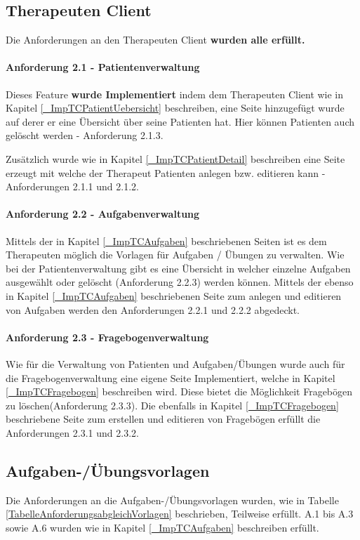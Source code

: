 \subsection{Therapeuten Client}
Die Anforderungen an den Therapeuten Client \textbf{wurden alle erfüllt.}
\paragraph{Anforderung 2.1 - Patientenverwaltung \textcolor{green}{\checkmark}}
Dieses Feature \textbf{wurde Implementiert} indem dem Therapeuten Client wie in Kapitel \ref{_ImpTCPatientUebersicht} beschreiben, eine Seite hinzugefügt wurde auf derer er eine Übersicht über seine Patienten hat. Hier können Patienten auch gelöscht werden - Anforderung 2.1.3.

Zusätzlich wurde wie in Kapitel \ref{_ImpTCPatientDetail} beschreiben eine Seite erzeugt mit welche der Therapeut Patienten anlegen bzw. editieren kann - Anforderungen 2.1.1 und 2.1.2.

\paragraph{Anforderung 2.2 - Aufgabenverwaltung \textcolor{green}{\checkmark}}
Mittels der in Kapitel \ref{_ImpTCAufgaben} beschriebenen Seiten ist es dem Therapeuten möglich die Vorlagen für Aufgaben / Übungen zu verwalten. Wie bei der Patientenverwaltung gibt es eine Übersicht in welcher einzelne Aufgaben ausgewählt oder gelöscht (Anforderung 2.2.3) werden können. Mittels der ebenso in Kapitel \ref{_ImpTCAufgaben} beschriebenen Seite zum anlegen und editieren von Aufgaben werden den Anforderungen 2.2.1 und 2.2.2 abgedeckt.

\paragraph{Anforderung 2.3 - Fragebogenverwaltung \textcolor{green}{\checkmark}}
Wie für die Verwaltung von Patienten und Aufgaben/Übungen wurde auch für die Fragebogenverwaltung eine eigene Seite Implementiert, welche in Kapitel \ref{_ImpTCFragebogen} beschreiben wird. Diese bietet die Möglichkeit Fragebögen zu löschen(Anforderung 2.3.3). Die ebenfalls in Kapitel \ref{_ImpTCFragebogen} beschriebene Seite zum erstellen und editieren von Fragebögen erfüllt die Anforderungen 2.3.1 und 2.3.2.

\subsection{Aufgaben-/Übungsvorlagen}
Die Anforderungen an die Aufgaben-/Übungsvorlagen wurden, wie in Tabelle \ref{TabelleAnforderungsabgleichVorlagen} beschrieben, Teilweise erfüllt.
A.1 bis A.3 sowie A.6 wurden wie in Kapitel \ref{_ImpTCAufgaben} beschreiben erfüllt. 

